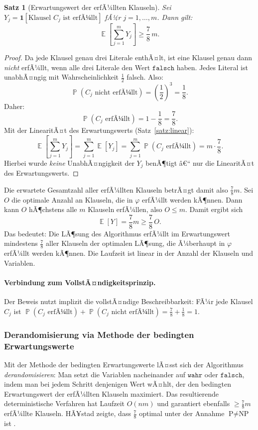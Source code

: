 ﻿\documentclass[12pt,a4paper]{article}
\theoremstyle{definition}
\theoremstyle{plain}
\newtheorem{satz}{Satz}[section]
\theoremstyle{remark}
\DeclareMathOperator{\E}{\mathbb{E}}
\DeclareMathOperator{\Prob}{\mathbb{P}}
\begin{document}
\begin{satz}[Erwartungswert der erfÃ¼llten Klauseln]\label{satz:ewsat}
  Sei $Y_j = \mathbf{1}[\text{Klausel } C_j \text{ ist erfÃ¼llt}]$ fÃ¼r
  $j = 1, \ldots, m$. Dann gilt:
  \[
    \E\!\left[\sum_{j=1}^m Y_j\right] \geq \frac{7}{8}\, m.
  \]
\end{satz}

\begin{proof}
  Da jede Klausel genau drei Literale enthÃ¤lt, ist eine Klausel genau dann
  \emph{nicht} erfÃ¼llt, wenn alle drei Literale den Wert $\mathtt{falsch}$
  haben. Jedes Literal ist unabhÃ¤ngig mit Wahrscheinlichkeit $\frac{1}{2}$
  falsch. Also:
  \[
    \Prob(C_j \text{ nicht erfÃ¼llt}) = \left(\frac{1}{2}\right)^{\!3} = \frac{1}{8}.
  \]
  Daher:
  \[
    \Prob(C_j \text{ erfÃ¼llt}) = 1 - \frac{1}{8} = \frac{7}{8}.
  \]
  Mit der LinearitÃ¤t des Erwartungswerts (Satz~\ref{satz:linear}):
  \[
    \E\!\left[\sum_{j=1}^m Y_j\right] = \sum_{j=1}^m \E[Y_j]
    = \sum_{j=1}^m \Prob(C_j \text{ erfÃ¼llt}) = m \cdot \frac{7}{8}.
  \]
  Hierbei wurde \emph{keine} UnabhÃ¤ngigkeit der $Y_j$ benÃ¶tigt â€“ nur die
  LinearitÃ¤t des Erwartungswerts.
\end{proof}

Die erwartete Gesamtzahl aller erfÃ¼llten Klauseln betrÃ¤gt damit also
$\frac{7}{8}m$. Sei $O$ die optimale Anzahl an Klauseln, die in $\varphi$
erfÃ¼llt werden kÃ¶nnen. Dann kann $O$ hÃ¶chstens alle $m$ Klauseln erfÃ¼llen,
also $O \le m$. Damit ergibt sich
\[
  \E[Y] = \frac{7}{8}m \ge \frac{7}{8}\, O.
\]
Das bedeutet: Die LÃ¶sung des Algorithmus erfÃ¼llt im Erwartungswert mindestens
$\frac{7}{8}$ aller Klauseln der optimalen LÃ¶sung, die Ã¼berhaupt in $\varphi$
erfÃ¼llt werden kÃ¶nnen. Die Laufzeit ist linear in der Anzahl der Klauseln
und Variablen.

\paragraph{Verbindung zum VollstÃ¤ndigkeitsprinzip.}
Der Beweis nutzt implizit die vollstÃ¤ndige Beschreibbarkeit: FÃ¼r jede Klausel
$C_j$ ist $\Prob(C_j \text{ erfÃ¼llt}) + \Prob(C_j \text{ nicht erfÃ¼llt})
= \frac{7}{8}+\frac{1}{8}=1$.

\subsubsection{Derandomisierung via Methode der bedingten Erwartungswerte}

Mit der Methode der bedingten Erwartungswerte \cite{alon2016probabilistic}
lÃ¤sst sich der Algorithmus \emph{derandomisieren}: Man setzt die Variablen
nacheinander auf $\mathtt{wahr}$ oder $\mathtt{falsch}$, indem man bei
jedem Schritt denjenigen Wert wÃ¤hlt, der den bedingten Erwartungswert der
erfÃ¼llten Klauseln maximiert. Das resultierende deterministische Verfahren
hat Laufzeit $O(nm)$ und garantiert ebenfalls $\geq \frac{7}{8}m$ erfÃ¼llte
Klauseln. HÃ¥stad zeigte, dass $\frac{7}{8}$ optimal unter der Annahme
$\text{P} \neq \text{NP}$ ist \cite{hastad2001some}.
\end{document}
